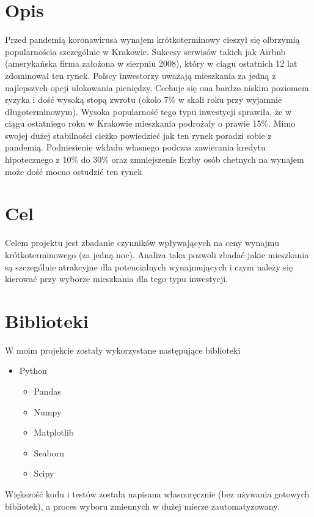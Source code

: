 \section{Opis}\label{sec:opis}

Przed pandemią koronawirusa wynajem krótkoterminowy cieszył się olbrzymią popularnościa szczególnie w Krakowie.
Sukcesy serwisów takich jak Airbnb (amerykańska firma założona w sierpniu 2008), który w ciągu ostatnich 12 lat zdominował ten rynek.
Polscy inwestorzy uważają mieszkania za jedną z najlepszych opcji ulokowania pieniędzy.
Cechuje się ona bardzo niskim poziomem ryzyka i dość wysoką stopą zwrotu (okolo 7\% w skali roku przy wyjamnie długoterminowym).
Wysoka popularność tego typu inwestycji sprawiła, że w ciągu ostatniego roku w Krakowie mieszkania podrożaly o prawie 15\%.
Mimo swojej dużej stabilności cieżko powiedzieć jak ten rynek poradzi sobie z pandemią.
Podniesienie wkładu własnego podczas zawierania kredytu hipotecznego z 10\% do 30\% oraz zmniejszenie liczby osób chetnych na wynajem może dość mocno ostudzić ten rynek

\section{Cel}\label{sec:cel}
Celem projektu jest zbadanie czynników wpływających na ceny wynajmu krótkoterminowego (za jedną noc).
Analiza taka pozwoli zbadać jakie mieszkania są szczególnie atrakcyjne dla potencialnych wynajmujących i czym należy się kierować przy wyborze mieszkania dla tego typu inwestycji.

\section{Biblioteki}\label{sec:biblioteki}

W moim projekcie zostały wykorzystane następujące biblioteki
\begin{itemize}
    \item Python
    \begin{itemize}
        \item Pandas
        \item Numpy
        \item Matplotlib
        \item Seaborn
        \item Scipy
    \end{itemize}
\end{itemize}

Większość kodu i testów została napisana własnoręcznie (bez używania gotowych bibliotek), a proces wyboru zmiennych w dużej mierze zautomatyzowany.
